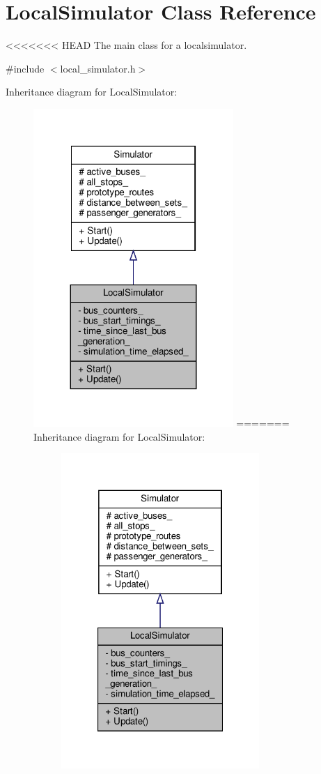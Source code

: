 \hypertarget{classLocalSimulator}{}\section{Local\+Simulator Class Reference}
\label{classLocalSimulator}


<<<<<<< HEAD
The main class for a localsimulator.  




{\ttfamily \#include $<$local\+\_\+simulator.\+h$>$}



Inheritance diagram for Local\+Simulator\+:\nopagebreak
\begin{figure}[H]
\begin{center}
\leavevmode
\includegraphics[width=215pt]{classLocalSimulator__inherit__graph}
=======
Inheritance diagram for Local\+Simulator\+:
\nopagebreak
\begin{figure}[H]
\begin{center}
\leavevmode
\includegraphics[width=213pt]{classLocalSimulator__inherit__graph}

\end{center}
\end{figure}
\end{center}
\end{figure}
